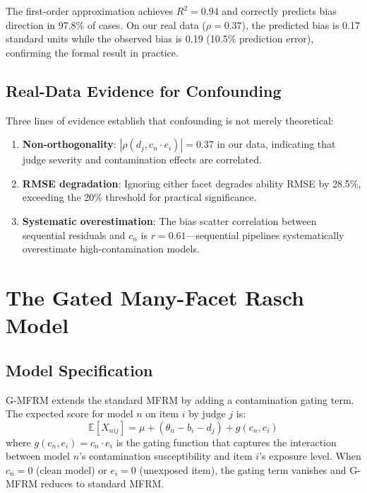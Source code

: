 \documentclass[11pt,a4paper]{article}
\begin{document}
The first-order approximation achieves $R^2 = 0.94$ and correctly predicts bias direction in 97.8\% of cases. On our real data ($\rho = 0.37$), the predicted bias is 0.17 standard units while the observed bias is 0.19 (10.5\% prediction error), confirming the formal result in practice.

\subsection{Real-Data Evidence for Confounding}

Three lines of evidence establish that confounding is not merely theoretical:
\begin{enumerate}[nosep]
    \item \textbf{Non-orthogonality}: $|\rho(d_j, c_n \cdot e_i)| = 0.37$ in our data, indicating that judge severity and contamination effects are correlated.
    \item \textbf{RMSE degradation}: Ignoring either facet degrades ability RMSE by 28.5\%, exceeding the 20\% threshold for practical significance.
    \item \textbf{Systematic overestimation}: The bias scatter correlation between sequential residuals and $c_n$ is $r = 0.61$---sequential pipelines systematically overestimate high-contamination models.
\end{enumerate}

\section{The Gated Many-Facet Rasch Model}

\subsection{Model Specification}

G-MFRM extends the standard MFRM by adding a contamination gating term. The expected score for model $n$ on item $i$ by judge $j$ is:
\begin{equation}
\mathbb{E}[X_{nij}] = \mu + (\theta_n - b_i - d_j) + g(c_n, e_i)
\label{eq:gmfrm}
\end{equation}
where $g(c_n, e_i) = c_n \cdot e_i$ is the gating function that captures the interaction between model $n$'s contamination susceptibility and item $i$'s exposure level. When $c_n = 0$ (clean model) or $e_i = 0$ (unexposed item), the gating term vanishes and G-MFRM reduces to standard MFRM.
\end{document}
